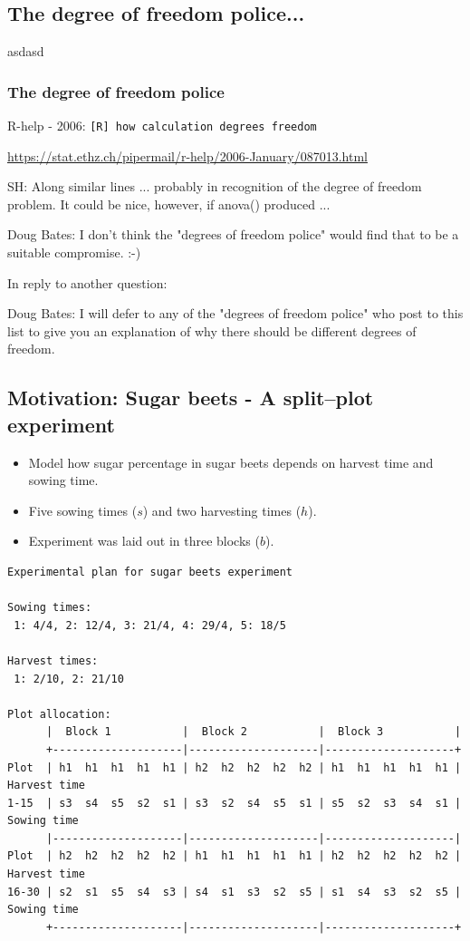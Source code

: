 \documentclass[compress]{beamer}\usepackage[]{graphicx}\usepackage[]{color}
\newenvironment{sframe}
{\begin{frame} [containsverbatim] }
  {\end{frame}}
\begin{document}
\subsection{The degree of freedom police...	}
\label{sec:degr-freed-polic}

\begin{sframe}{asdasd}
\frametitle{The degree of freedom police}

R-help - 2006: \texttt{[R] how calculation degrees freedom}

\url{https://stat.ethz.ch/pipermail/r-help/2006-January/087013.html}

SH: Along similar lines ...  probably in recognition of the degree of freedom problem. It could be nice, however, if anova() produced ... 

Doug Bates: I don't think the "degrees of freedom police" would find that to be a
suitable compromise. :-)

In reply to another question:

Doug Bates: I will defer to any of the "degrees of freedom police" who post to
this list to give you an explanation of why there should be different
degrees of freedom. 

\end{sframe}





\subsection{Motivation: Sugar beets - A split--plot experiment}
\label{sec:xxx}

\begin{sframe}
 \begin{itemize}
 \item Model how sugar percentage in sugar beets depends on
   harvest time and sowing time.
 \item Five sowing times ($s$) and two harvesting times ($h$).
 \item Experiment was laid out in three blocks ($b$).
 \end{itemize}

{\tiny
\begin{verbatim}
Experimental plan for sugar beets experiment

Sowing times:
 1: 4/4, 2: 12/4, 3: 21/4, 4: 29/4, 5: 18/5

Harvest times:
 1: 2/10, 2: 21/10

Plot allocation:
      |  Block 1           |  Block 2           |  Block 3           |
      +--------------------|--------------------|--------------------+
Plot  | h1  h1  h1  h1  h1 | h2  h2  h2  h2  h2 | h1  h1  h1  h1  h1 | Harvest time
1-15  | s3  s4  s5  s2  s1 | s3  s2  s4  s5  s1 | s5  s2  s3  s4  s1 | Sowing time
      |--------------------|--------------------|--------------------|
Plot  | h2  h2  h2  h2  h2 | h1  h1  h1  h1  h1 | h2  h2  h2  h2  h2 | Harvest time
16-30 | s2  s1  s5  s4  s3 | s4  s1  s3  s2  s5 | s1  s4  s3  s2  s5 | Sowing time
      +--------------------|--------------------|--------------------+
\end{verbatim}
}
\end{sframe}
\end{document}

